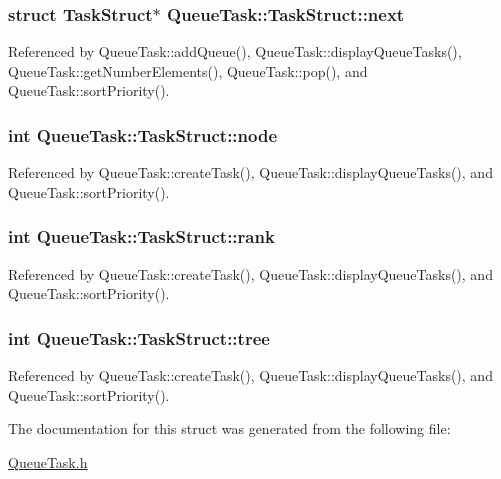 \subsubsection[{\texorpdfstring{next}{next}}]{\setlength{\rightskip}{0pt plus 5cm}struct {\bf Task\+Struct}$\ast$ Queue\+Task\+::\+Task\+Struct\+::next}\hypertarget{structQueueTask_1_1TaskStruct_aff77873a32e938c956c84deb01f98e65}{}\label{structQueueTask_1_1TaskStruct_aff77873a32e938c956c84deb01f98e65}


Referenced by Queue\+Task\+::add\+Queue(), Queue\+Task\+::display\+Queue\+Tasks(), Queue\+Task\+::get\+Number\+Elements(), Queue\+Task\+::pop(), and Queue\+Task\+::sort\+Priority().

\subsubsection[{\texorpdfstring{node}{node}}]{\setlength{\rightskip}{0pt plus 5cm}int Queue\+Task\+::\+Task\+Struct\+::node}\hypertarget{structQueueTask_1_1TaskStruct_a22eb8e22f500809266c4983897b9af7f}{}\label{structQueueTask_1_1TaskStruct_a22eb8e22f500809266c4983897b9af7f}


Referenced by Queue\+Task\+::create\+Task(), Queue\+Task\+::display\+Queue\+Tasks(), and Queue\+Task\+::sort\+Priority().

\subsubsection[{\texorpdfstring{rank}{rank}}]{\setlength{\rightskip}{0pt plus 5cm}int Queue\+Task\+::\+Task\+Struct\+::rank}\hypertarget{structQueueTask_1_1TaskStruct_af9877fb064cb899ac88ffef431d98f47}{}\label{structQueueTask_1_1TaskStruct_af9877fb064cb899ac88ffef431d98f47}


Referenced by Queue\+Task\+::create\+Task(), Queue\+Task\+::display\+Queue\+Tasks(), and Queue\+Task\+::sort\+Priority().

\subsubsection[{\texorpdfstring{tree}{tree}}]{\setlength{\rightskip}{0pt plus 5cm}int Queue\+Task\+::\+Task\+Struct\+::tree}\hypertarget{structQueueTask_1_1TaskStruct_a6b1c9ba8e5b30acfa78e61c95c7cb897}{}\label{structQueueTask_1_1TaskStruct_a6b1c9ba8e5b30acfa78e61c95c7cb897}


Referenced by Queue\+Task\+::create\+Task(), Queue\+Task\+::display\+Queue\+Tasks(), and Queue\+Task\+::sort\+Priority().



The documentation for this struct was generated from the following file\+:\begin{DoxyCompactItemize}
\item 
\hyperlink{QueueTask_8h}{Queue\+Task.\+h}\end{DoxyCompactItemize}
